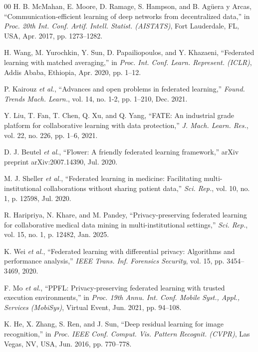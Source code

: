 \documentclass[conference]{IEEEtran}
\begin{document}
\begin{thebibliography}{00}
 H. B. McMahan, E. Moore, D. Ramage, S. Hampson, and B. Agüera y Arcas, ``Communication-efficient learning of deep networks from decentralized data,'' in \textit{Proc. 20th Int. Conf. Artif. Intell. Statist. (AISTATS)}, Fort Lauderdale, FL, USA, Apr. 2017, pp. 1273--1282.

 H. Wang, M. Yurochkin, Y. Sun, D. Papailiopoulos, and Y. Khazaeni, ``Federated learning with matched averaging,'' in \textit{Proc. Int. Conf. Learn. Represent. (ICLR)}, Addis Ababa, Ethiopia, Apr. 2020, pp. 1--12.

 P. Kairouz \textit{et al.}, ``Advances and open problems in federated learning,'' \textit{Found. Trends Mach. Learn.}, vol. 14, no. 1-2, pp. 1--210, Dec. 2021.

 Y. Liu, T. Fan, T. Chen, Q. Xu, and Q. Yang, ``FATE: An industrial grade platform for collaborative learning with data protection,'' \textit{J. Mach. Learn. Res.}, vol. 22, no. 226, pp. 1--6, 2021.

 D. J. Beutel \textit{et al.}, ``Flower: A friendly federated learning framework,'' arXiv preprint arXiv:2007.14390, Jul. 2020.

 M. J. Sheller \textit{et al.}, ``Federated learning in medicine: Facilitating multi-institutional collaborations without sharing patient data,'' \textit{Sci. Rep.}, vol. 10, no. 1, p. 12598, Jul. 2020.

 R. Haripriya, N. Khare, and M. Pandey, ``Privacy-preserving federated learning for collaborative medical data mining in multi-institutional settings,'' \textit{Sci. Rep.}, vol. 15, no. 1, p. 12482, Jan. 2025.

 K. Wei \textit{et al.}, ``Federated learning with differential privacy: Algorithms and performance analysis,'' \textit{IEEE Trans. Inf. Forensics Security}, vol. 15, pp. 3454--3469, 2020.

 F. Mo \textit{et al.}, ``PPFL: Privacy-preserving federated learning with trusted execution environments,'' in \textit{Proc. 19th Annu. Int. Conf. Mobile Syst., Appl., Services (MobiSys)}, Virtual Event, Jun. 2021, pp. 94--108.

 K. He, X. Zhang, S. Ren, and J. Sun, ``Deep residual learning for image recognition,'' in \textit{Proc. IEEE Conf. Comput. Vis. Pattern Recognit. (CVPR)}, Las Vegas, NV, USA, Jun. 2016, pp. 770--778.


\end{thebibliography}
\end{document}
